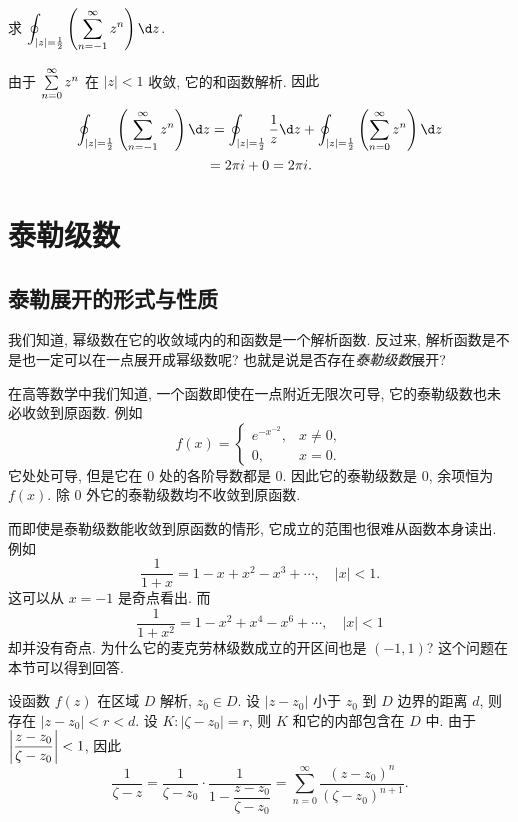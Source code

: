 \begin{example}
	求 $\displaystyle\oint_{|z|=\half }\left(\sum_{n=-1}^\infty z^n\right)\d z$.
\end{example}

\begin{solution}
	由于 $\sum\limits_{n=0}^\infty z^n$ 在 $|z|<1$ 收敛,
{它的和函数解析.
}{因此
	\begin{align*}
	\oint_{|z|=\half }\left(\sum_{n=-1}^\infty z^n\right)\d z
	&=\oint_{|z|=\half }\frac1z\d z+\oint_{|z|=\half }\left(\sum_{n=0}^\infty z^n\right)\d z\\
	&{=2\pi i+0=2\pi i.}
\end{align*}}
\end{solution}

\section{泰勒级数}

\subsection{泰勒展开的形式与性质}

我们知道, 幂级数在它的收敛域内的和函数是一个解析函数.
反过来, 解析函数是不是也一定可以在一点展开成幂级数呢? 也就是说是否存在\emph{泰勒级数}展开?

在高等数学中我们知道, 一个函数即使在一点附近无限次可导, 它的泰勒级数也未必收敛到原函数.
例如
\[f(x)=\begin{cases}
e^{-x^{-2}},&x\neq 0,\\
0,&x=0.\end{cases}\]
它处处可导, 但是它在 $0$ 处的各阶导数都是 $0$.
因此它的泰勒级数是 $0$, 余项恒为 $f(x)$.
除 $0$ 外它的泰勒级数均不收敛到原函数.

而即使是泰勒级数能收敛到原函数的情形, 它成立的范围也很难从函数本身读出.
例如
\[\dfrac1{1+x}=1-x+x^2-x^3+\cdots,\quad|x|<1.\]
这可以从 $x=-1$ 是奇点看出.
而
\[\dfrac1{1+x^2}=1-x^2+x^4-x^6+\cdots,\quad|x|<1\]
却并没有奇点.
为什么它的麦克劳林级数成立的开区间也是 $(-1,1)$?
这个问题在本节可以得到回答.

设函数 $f(z)$ 在区域 $D$ 解析, $z_0\in D$.
设 $|z-z_0|$ 小于 $z_0$ 到 $D$ 边界的距离 $d$,
则存在 $|z-z_0|<r<d$.
设 $K:|\zeta-z_0|=r$, 则 $K$ 和它的内部包含在 $D$ 中.
由于 $\left|\dfrac{z-z_0}{\zeta-z_0}\right|<1$, 因此
\[\frac1{\zeta-z}=\frac1{\zeta-z_0}\cdot\frac1{1-\dfrac{z-z_0}{\zeta-z_0}}=\sum_{n=0}^\infty\frac{(z-z_0)^n}{(\zeta-z_0)^{n+1}}.\]


\begin{center}
\end{center}

